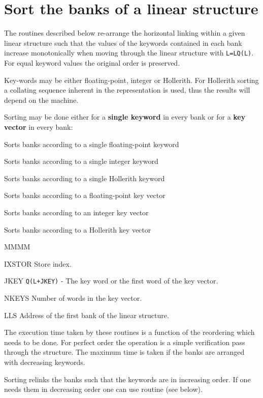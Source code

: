 \section{Sort the banks of a linear structure}
\par The routines described below
re-arrange the horizontal linking
within a given linear structure such that the values of the
keywords contained in
each bank increase monotonically when moving through the linear
structure with {\tt L=LQ(L)}.
For equal keyword values the original order is preserved.
\par Key-words may be either floating-point, integer or Hollerith.
For Hollerith sorting a collating sequence
inherent in the representation is used,
thus the results will depend on the machine.
\par Sorting may be done either for a
{\bf single keyword} in every bank
or for a {\bf key vector} in every bank:
\par Sorts banks according to a single floating-point keyword
\par Sorts banks according to a single integer keyword
\par Sorts banks according to a single Hollerith keyword
\par
{}
\par Sorts banks according to a floating-point key vector
\par Sorts banks according to an integer key vector
\par Sorts banks according to a Hollerith key vector
\Idesc
\begin{DL}{MMMM}
\item[IXSTOR]Store index.
\item[JKEY]{\tt Q(L+JKEY)} - The key word or the first word of the key vector.
\item[NKEYS]Number of words in the key vector.
\item[LLS]Address of the first bank of the linear structure.
\end{DL}
\par The execution time taken by these routines is a function
of the reordering which needs to be done.
For perfect order the operation is a simple verification pass
through the structure.
The maximum time is taken if the banks are arranged with
decreasing keywords.
\par Sorting relinks the banks such that the keywords are in
increasing order.
If one needs them in decreasing order one can use routine 
(see below).
